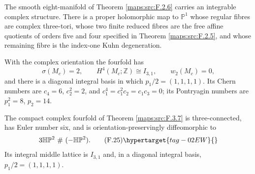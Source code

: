 \begin{theorem}\hypertarget{tag-02O9}{}\label{maps:src:F.3.7}


The smooth eight-manifold of Theorem \ref{maps:src:F.2.6} carries an integrable
complex structure.  There is a proper holomorphic map to
$\mathbb P^1$ whose regular fibres are complex three-tori,
whose two finite reduced fibres are the free affine quotients
of orders five and four specified in Theorem \ref{maps:src:F.2.5}, and whose
remaining fibre is the index-one Kuhn degeneration.

\end{theorem}

\begin{theorem}\hypertarget{tag-02QM}{}\label{night:P1.13}
With the complex orientation the fourfold has
\[
\sigma(M_c)=2,\qquad H^4(M_c;\mathbb Z)\cong I_{3,1},\qquad
w_2(M_c)=0,
\]
and there is a diagonal integral basis in which
$p_1/2=(1,1,1,1)$.
Its Chern numbers are
$c_4=6$, $c_2^2=2$, and
$c_1^4=c_1^2c_2=c_1c_3=0$; its Pontryagin numbers are
$p_1^2=8$, $p_2=14$.
\end{theorem}

\begin{theorem}\hypertarget{tag-02OC}{}\label{maps:src:F.4.1}


The compact complex fourfold of Theorem \ref{maps:src:F.3.7} is three-connected,
has Euler number six, and is orientation-preservingly diffeomorphic to
\[
 3\mathbb H\mathbb P^2\ \#\ (-\mathbb H\mathbb P^2).
 \tag{F.25}\hypertarget{tag-02EW}{}\label{maps:eq:F.25}
\]
Its integral middle lattice is $I_{3,1}$ and, in a diagonal integral
basis, $p_1/2=(1,1,1,1)$.  

\end{theorem}